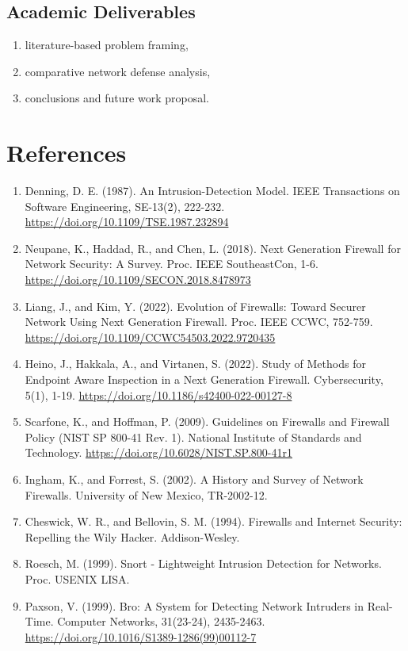 \documentclass[12pt,a4paper]{article}
\begin{document}
\subsection{Academic Deliverables}
\begin{enumerate}
    \item literature-based problem framing,
    \item comparative network defense analysis,
    \item conclusions and future work proposal.
\end{enumerate}

\section{References}

\begin{enumerate}
\item Denning, D. E. (1987). An Intrusion-Detection Model. IEEE Transactions on Software Engineering, SE-13(2), 222-232. \url{https://doi.org/10.1109/TSE.1987.232894}
\item Neupane, K., Haddad, R., and Chen, L. (2018). Next Generation Firewall for Network Security: A Survey. Proc. IEEE SoutheastCon, 1-6. \url{https://doi.org/10.1109/SECON.2018.8478973}
\item Liang, J., and Kim, Y. (2022). Evolution of Firewalls: Toward Securer Network Using Next Generation Firewall. Proc. IEEE CCWC, 752-759. \url{https://doi.org/10.1109/CCWC54503.2022.9720435}
\item Heino, J., Hakkala, A., and Virtanen, S. (2022). Study of Methods for Endpoint Aware Inspection in a Next Generation Firewall. Cybersecurity, 5(1), 1-19. \url{https://doi.org/10.1186/s42400-022-00127-8}
\item Scarfone, K., and Hoffman, P. (2009). Guidelines on Firewalls and Firewall Policy (NIST SP 800-41 Rev. 1). National Institute of Standards and Technology. \url{https://doi.org/10.6028/NIST.SP.800-41r1}
\item Ingham, K., and Forrest, S. (2002). A History and Survey of Network Firewalls. University of New Mexico, TR-2002-12.
\item Cheswick, W. R., and Bellovin, S. M. (1994). Firewalls and Internet Security: Repelling the Wily Hacker. Addison-Wesley.
\item Roesch, M. (1999). Snort - Lightweight Intrusion Detection for Networks. Proc. USENIX LISA.
\item Paxson, V. (1999). Bro: A System for Detecting Network Intruders in Real-Time. Computer Networks, 31(23-24), 2435-2463. \url{https://doi.org/10.1016/S1389-1286(99)00112-7}

\end{enumerate}
\end{document}
